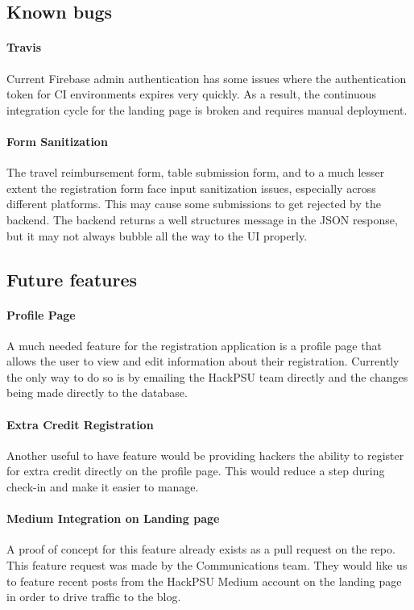 \documentclass[twoside, 12pt]{article}
\begin{document}
\subsection{Known bugs}
\paragraph{Travis}
\par Current Firebase admin authentication has some issues where the authentication token for CI environments expires very quickly. As a result, the continuous integration cycle for the landing page is broken and requires manual deployment.
\paragraph{Form Sanitization}
\par The travel reimbursement form, table submission form, and to a much lesser extent the registration form face input sanitization issues, especially across different platforms. This may cause some submissions to get rejected by the backend. The backend returns a well structures message in the JSON response, but it may not always bubble all the way to the UI properly.
\subsection{Future features}
\paragraph{Profile Page}
\par A much needed feature for the registration application is a profile page that allows the user to view and edit information about their registration. Currently the only way to do so is by emailing the HackPSU team directly and the changes being made directly to the database.
\paragraph{Extra Credit Registration}
\par Another useful to have feature would be providing hackers the ability to register for extra credit directly on the profile page. This would reduce a step during check-in and make it easier to manage.
\paragraph{Medium Integration on Landing page}
\par A proof of concept for this feature already exists as a pull request on the repo. This feature request was made by the Communications team. They would like us to feature recent posts from the HackPSU Medium account on the landing page in order to drive traffic to the blog.
\end{document}
